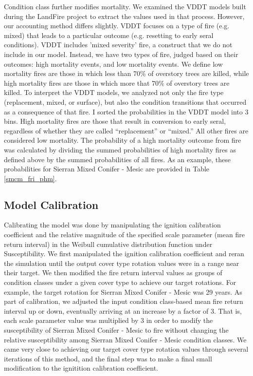\begin{itemize}
Condition class further modifies mortality. We examined the VDDT models built during the LandFire project to extract the values used in that process. However, our accounting method differs slightly. VDDT focuses on a type of fire (e.g. mixed) that leads to a particular outcome (e.g. resetting to early seral conditions). VDDT includes 'mixed severity' fire, a construct that we do not include in our model. Instead, we have two types of fire, judged based on their outcomes: high mortality events, and low mortality events. We define low mortality fires are those in which less than 70\% of overstory trees are killed, while high mortality fires are those in which more that 70\% of overstory trees are killed. To interpret the VDDT models, we analyzed not only the fire type (replacement, mixed, or surface), but also the condition transitions that occurred as a consequence of that fire. I sorted the probabilities in the VDDT model into 3 bins. High mortality fires are those that result in conversion to early seral, regardless of whether they are called ``replacement'' or ``mixed.'' All other fires are considered low mortality. The probability of a high mortality outcome from fire was calculated by dividing the summed probabilities of high mortality fires as defined above by the summed probabilities of all fires. As an example, these probabilities for Sierran Mixed Conifer - Mesic are provided in Table \ref{smcm_fri_phm}.

\end{itemize}

\subsection{Model Calibration}
Calibrating the model was done by manipulating the ignition calibration coefficient and the relative magnitude of the specified scale parameter (mean fire return interval) in the Weibull cumulative distribution function under Susceptibility. We first manipulated the ignition calibration coefficient and reran the simulation until the output cover type rotation values were in a range near their target. We then modified the fire return interval values as groups of condition classes under a given cover type to achieve our target rotations. For example, the target rotation for Sierran Mixed Conifer - Mesic was 29 years. As part of calibration, we adjusted the input condition class-based mean fire return interval up or down, eventually arriving at an increase by a factor of 3. That is, each scale parameter value was multiplied by 3 in order to modify the susceptibility of Sierran Mixed Conifer - Mesic to fire without changing the relative susceptibility among Sierran Mixed Conifer - Mesic condition classes. We came very close to achieving our target cover type rotation values through several iterations of this method, and the final step was to make a final small modification to the ignitition calibration coefficient.

